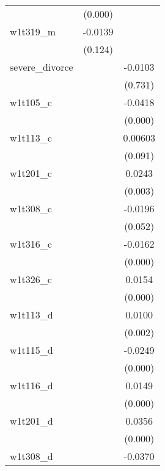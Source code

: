 {\begin{tabular}{l*{2}{c}}
            &     (0.000)         &                     \\
[1em]
w1t319\_m    &     -0.0139         &                     \\
            &     (0.124)         &                     \\
[1em]
severe\_divorce&                     &     -0.0103         \\
            &                     &     (0.731)         \\
[1em]
w1t105\_c    &                     &     -0.0418\sym{***}\\
            &                     &     (0.000)         \\
[1em]
w1t113\_c    &                     &     0.00603         \\
            &                     &     (0.091)         \\
[1em]
w1t201\_c    &                     &      0.0243\sym{**} \\
            &                     &     (0.003)         \\
[1em]
w1t308\_c    &                     &     -0.0196         \\
            &                     &     (0.052)         \\
[1em]
w1t316\_c    &                     &     -0.0162\sym{***}\\
            &                     &     (0.000)         \\
[1em]
w1t326\_c    &                     &      0.0154\sym{***}\\
            &                     &     (0.000)         \\
[1em]
w1t113\_d    &                     &      0.0100\sym{**} \\
            &                     &     (0.002)         \\
[1em]
w1t115\_d    &                     &     -0.0249\sym{***}\\
            &                     &     (0.000)         \\
[1em]
w1t116\_d    &                     &      0.0149\sym{***}\\
            &                     &     (0.000)         \\
[1em]
w1t201\_d    &                     &      0.0356\sym{***}\\
            &                     &     (0.000)         \\
[1em]
w1t308\_d    &                     &     -0.0370\sym{***}\\

\end{tabular}}
